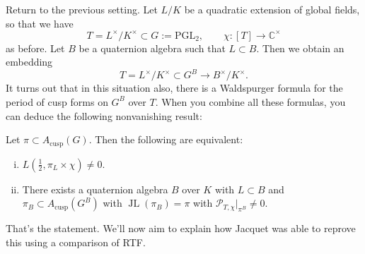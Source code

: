 \documentclass[reqno]{amsart} 
\numberwithin{theorem}{section}
\numberwithin{equation}{section}
\numberwithin{exercise}{section}
\begin{document}
Return to the previous setting.  Let $L / K$ be a quadratic extension of global fields, so that we have
\begin{equation*}
  T = L^\times / K^\times \subset G := \mathrm{PGL}_2, \qquad \chi :[T] \rightarrow \mathbb{C}^\times
\end{equation*}
as before.  Let $B$ be a quaternion algebra such that $L \subset B$.  Then we obtain an embedding
\begin{equation*}
  T = L^\times / K^\times \subset G^B \rightarrow B^\times / K^\times.
\end{equation*}
It turns out that in this situation also, there is a Waldspurger formula for the period of cusp forms on $G^B$ over $T$.  When you combine all these formulas, you can deduce the following nonvanishing result:
\begin{theorem}[Waldspurger]
  Let $\pi \subset A_{\mathrm{cusp}}(G)$.  Then the following are equivalent:
  \begin{enumerate}[(i)]
  \item $L(\tfrac{1}{2}, \pi_L \times \chi) \neq 0$.
  \item There exists a quaternion algebra $B$ over $K$ with $L \subset B$ and $\pi_B \subset A_{\mathrm{cusp}}(G^B)$ with $\operatorname{JL}(\pi_B) = \pi$ with $\mathcal{P}_{T, \chi} |_{\pi^B} \neq 0$.
  \end{enumerate}
\end{theorem}
That's the statement.  We'll now aim to explain how Jacquet was able to reprove this using a comparison of RTF.

{} 
\end{document}
